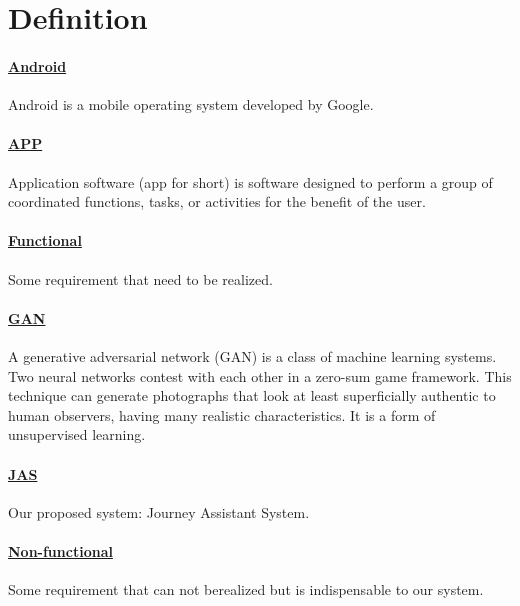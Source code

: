 \documentclass[10pt]{article}
\begin{document}
\section{Definition}
\paragraph{\underline{Android}} Android is a mobile operating system developed by Google.

\paragraph{\underline{APP}} Application software (app for short) is software designed to perform a group of coordinated functions, tasks, or activities for the benefit of the user. 

\paragraph{\underline{Functional}} Some requirement that need to be realized.

\paragraph{\underline{GAN}} A generative adversarial network (GAN) is a class of machine learning systems. Two neural networks contest with each other in a zero-sum game framework. This technique can generate photographs that look at least superficially authentic to human observers, having many realistic characteristics. It is a form of unsupervised learning.

\paragraph{\underline{JAS}}  Our proposed system: Journey Assistant System.

\paragraph{\underline{Non-functional}} Some requirement that can not berealized but is indispensable to our system.

\end{document}
